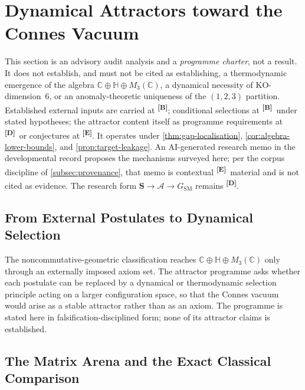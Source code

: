 \documentclass[12pt,a4paper,twoside]{article}
\theoremstyle{plain}
\theoremstyle{definition}
\theoremstyle{remark}
\newcommand{\catmark}[1]{\textsuperscript{\textsf{\textbf{[#1]}}}}
\begin{document}
\section{Dynamical Attractors toward the Connes Vacuum}
\label{sec:connes-attractor}

\begin{governancebox}
This section is an advisory audit analysis and a \emph{programme
charter}, not a result. It does not establish, and must not be cited as
establishing, a thermodynamic emergence of the algebra
$\mathbb{C}\oplus\mathbb{H}\oplus M_3(\mathbb{C})$, a dynamical necessity
of KO-dimension~6, or an anomaly-theoretic uniqueness of the $(1,2,3)$
partition. Established external inputs are carried at \catmark{B};
conditional selections at \catmark{B}\ under stated hypotheses; the
attractor content itself as programme requirements at \catmark{D}\ or
conjectures at \catmark{E}. It operates under
\cref{thm:gap-localisation}, \cref{cor:algebra-lower-bounds}, and
\cref{prop:target-leakage}. An AI-generated research memo in the
developmental record proposes the mechanisms surveyed here; per the
corpus discipline of \cref{subsec:provenance}, that memo is contextual
\catmark{E}\ material and is not cited as evidence. The research form
$\mathbf S \to \mathcal A \to G_{\mathrm{SM}}$ remains \catmark{D}.
\end{governancebox}

\subsection{From External Postulates to Dynamical Selection}
\label{subsec:attractor-programme}

The noncommutative-geometric classification reaches
$\mathbb{C}\oplus\mathbb{H}\oplus M_3(\mathbb{C})$ only through an
externally imposed axiom set. The attractor programme asks whether each
postulate can be replaced by a dynamical or thermodynamic selection
principle acting on a larger configuration space, so that the Connes
vacuum would arise as a stable attractor rather than as an axiom. The
programme is stated here in falsification-disciplined form; none of its
attractor claims is established.

\subsection{The Matrix Arena and the Exact Classical Comparison}
\label{subsec:matrix-arena}
\end{document}
